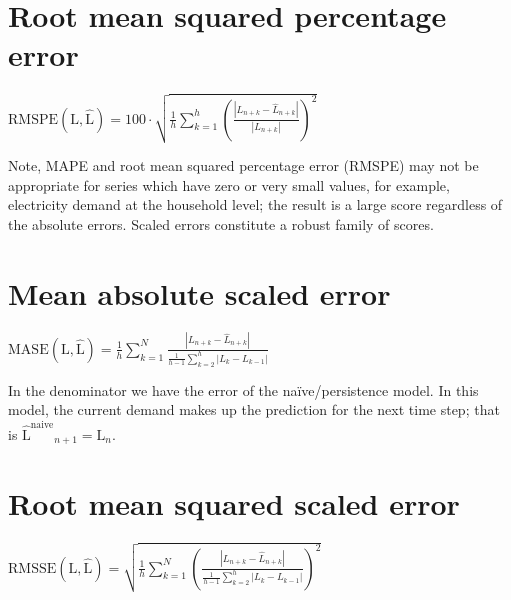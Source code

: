 \section{Root mean squared percentage error}\label{rmspe}
\begin{definition}
    $\mathrm{RMSPE}(\mathrm{L},\mathrm{\hat{L}})=100\cdot\sqrt{\frac{1}{h}\sum\limits_{k=1}^{h} \left(\frac{|L_{n+k}-\hat{L}_{n+k}|}{|L_{n+k}|}\right)^2}$
\end{definition}
Note, MAPE and root mean squared percentage error (RMSPE) may not be appropriate for series which have zero or very small values, for example, electricity demand at the household level; the result is a large score regardless of the absolute errors.
Scaled errors constitute a robust family of scores.
\section{Mean absolute scaled error}\label{mase}
\begin{definition}
    $\mathrm{MASE}(\mathrm{L},\mathrm{\hat{L}})=\frac{1}{h}\sum\limits_{k=1}^N\frac{|L_{n+k}-\hat{L}_{n+k}|}{\frac{1}{h-1}\sum\limits_{k=2}^{h}|L_{k}-L_{k-1}|}$
\end{definition}
In the denominator we have the error of the naïve/persistence model. 
In this model, the current demand makes up the prediction for the next time step; that is $\mathrm{\hat{L}^{\mathrm{naive}}}_{n+1}=\mathrm{L}_{n}$.
\section{Root mean squared scaled error}\label{rmsse}
\begin{definition}
    $\mathrm{RMSSE}(\mathrm{L},\mathrm{\hat{L}})=\sqrt{\frac{1}{h}\sum\limits_{k=1}^N\left(\frac{|L_{n+k}-\hat{L}_{n+k}|}{\frac{1}{h-1}\sum\limits_{k=2}^{h}|L_{k}-L_{k-1}|}\right)^2}$
\end{definition}


